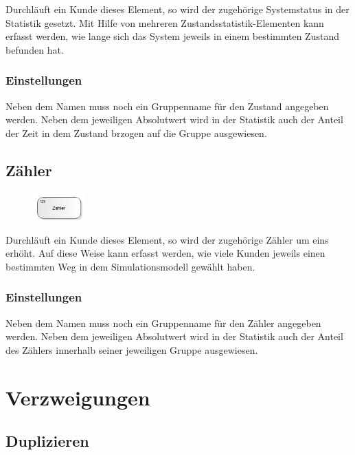 Durchläuft ein Kunde dieses Element, so wird der zugehörige Systemstatus in der Statistik gesetzt. 
Mit Hilfe von mehreren Zustandsstatistik-Elementen kann erfasst werden, wie lange sich das System
jeweils in einem bestimmten Zustand befunden hat.

\subsection*{Einstellungen}

Neben dem Namen muss noch ein Gruppenname für den Zustand angegeben werden. Neben dem jeweiligen
Absolutwert wird in der Statistik auch der Anteil der Zeit in dem Zustand brzogen auf die Gruppe ausgewiesen.


\section{Zähler}
\label{ref:ModelElementCounter}

\begin{figure}
\vspace{-22pt}
\includegraphics[width=2cm]{imageModelElementCounter.png}
\vspace{-22pt}
\end{figure}

Durchläuft ein Kunde dieses Element, so wird der zugehörige Zähler um eins erhöht. Auf diese Weise kann erfasst werden,
wie viele Kunden jeweils einen bestimmten Weg in dem Simulationsmodell gewählt haben.

\subsection*{Einstellungen}

Neben dem Namen muss noch ein Gruppenname für den Zähler angegeben werden. Neben dem jeweiligen
Absolutwert wird in der Statistik auch der Anteil des Zählers innerhalb seiner jeweiligen Gruppe ausgewiesen.





\chapter{Verzweigungen}

\section{Duplizieren}
\label{ref:ModelElementDuplicate}

